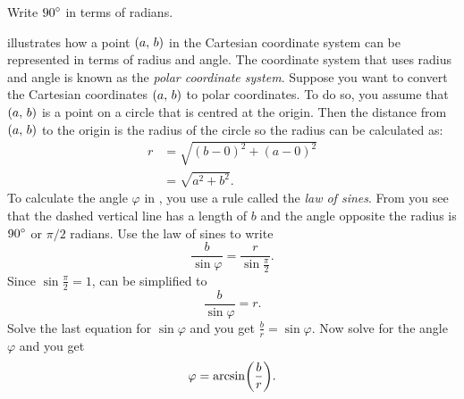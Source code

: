 \documentclass[a4paper,oneside,12pt]{article}
\begin{document}
\begin{exercise}
Write ${90}^{\circ}$ in terms of radians.
\end{exercise}


 illustrates
how a point $\left\lparen{a},\, {b}\right\rparen$ in the Cartesian coordinate system can be
represented in terms of radius and angle.  The coordinate system that
uses radius and angle is known as the \emph{polar coordinate system}.
Suppose you want to convert the Cartesian coordinates $\left\lparen{a},\, {b}\right\rparen$
to polar coordinates.  To do so, you assume that $\left\lparen{a},\, {b}\right\rparen$ is a
point on a circle that is centred at the origin.  Then the distance
from $\left\lparen{a},\, {b}\right\rparen$ to the origin is the radius of the circle so the
radius can be calculated as:
\begin{align*}
r
&=
\sqrt{
  (b - 0)^2 + (a - 0)^2
} \\[4pt]
&=
\sqrt{
  a^2 + b^2
}.
\end{align*}
To calculate the angle $\varphi$ in
, you use a
rule called the \emph{law of sines}.  From
 you see that
the dashed vertical line has a length of $b$ and the angle opposite
the radius is ${90}^{\circ}$ or $\pi / 2$ radians.  Use the law of
sines to write
\begin{equation}
\label{eqn:law_of_sines}
\frac{b}{\sin \varphi}
=
\frac{r}{\sin \frac{\pi}{2}}.
\end{equation}
Since $\sin \frac{\pi}{2} = 1$,  can be
simplified to
\[
\frac{b}{\sin \varphi}
=
r.
\]
Solve the last equation for $\sin \varphi$ and you get
$\frac{b}{r} = \sin \varphi$.  Now solve for the angle $\varphi$ and
you get
\[
\varphi
=
\arcsin\parenthesis*{\frac{b}{r}}.
\]
\end{document}
